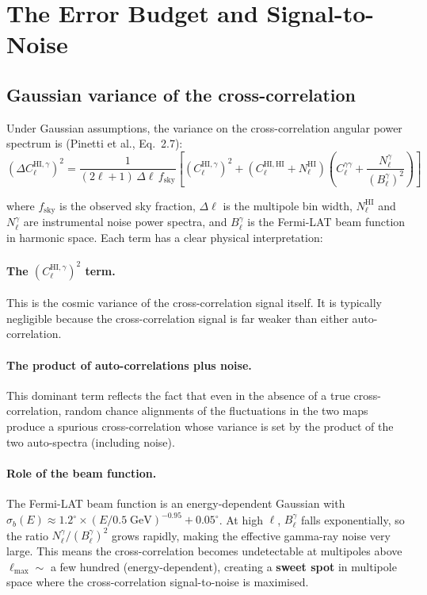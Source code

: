 \documentclass[10pt,a4paper]{article}
\newcommand{\Cl}{C_\ell}
\newcommand{\fsky}{f_{\mathrm{sky}}}
\begin{document}
\section{The Error Budget and Signal-to-Noise}
\label{sec:part6}

\subsection{Gaussian variance of the cross-correlation}

Under Gaussian assumptions, the variance on the cross-correlation angular power spectrum is (Pinetti et al., Eq.~2.7):
\begin{equation}
\label{eq:variance}
\boxed{
\left(\Delta \Cl^{\mathrm{HI}, \gamma}\right)^2 = \frac{1}{(2\ell + 1) \, \Delta\ell \, \fsky} \left[\left(\Cl^{\mathrm{HI}, \gamma}\right)^2 + \left(\Cl^{\mathrm{HI, HI}} + N_\ell^{\mathrm{HI}}\right) \left(\Cl^{\gamma\gamma} + \frac{N_\ell^\gamma}{(B_\ell^\gamma)^2}\right)\right]
}
\end{equation}

where $\fsky$ is the observed sky fraction, $\Delta\ell$ is the multipole bin width, $N_\ell^{\mathrm{HI}}$ and $N_\ell^\gamma$ are instrumental noise power spectra, and $B_\ell^\gamma$ is the Fermi-LAT beam function in harmonic space. Each term has a clear physical interpretation:

\paragraph{The $(\Cl^{\mathrm{HI}, \gamma})^2$ term.} This is the cosmic variance of the cross-correlation signal itself. It is typically negligible because the cross-correlation signal is far weaker than either auto-correlation.

\paragraph{The product of auto-correlations plus noise.} This dominant term reflects the fact that even in the absence of a true cross-correlation, random chance alignments of the fluctuations in the two maps produce a spurious cross-correlation whose variance is set by the product of the two auto-spectra (including noise).

\paragraph{Role of the beam function.} The Fermi-LAT beam function is an energy-dependent Gaussian with $\sigma_b(E) \approx 1.2^\circ \times (E/0.5 \; \mathrm{GeV})^{-0.95} + 0.05^\circ$. At high $\ell$, $B_\ell^\gamma$ falls exponentially, so the ratio $N_\ell^\gamma / (B_\ell^\gamma)^2$ grows rapidly, making the effective gamma-ray noise very large. This means the cross-correlation becomes undetectable at multipoles above $\ell_{\mathrm{max}} \sim$ a few hundred (energy-dependent), creating a \textbf{sweet spot} in multipole space where the cross-correlation signal-to-noise is maximised.
\end{document}

